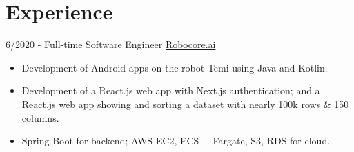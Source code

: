 \documentclass[letterpaper]{twentysecondcv} %
\begin{document}
\makeprofile %



\section{Experience}{\faAlignJustify}

\begin{twenty} %


\twentyitem
    	{6/2020 - }
	{}
         {Full-time Software Engineer}
         {\href{https://www.robocore.ai}{Robocore.ai}}
        {}
        {\vspace{-2mm}\begin{itemize}[topsep=0pt,partopsep=0pt]
				\item Development of Android apps on the robot Temi using Java and Kotlin.
				\item Development of a React.js web app with Next.js authentication; and a React.js web app showing and sorting a dataset with nearly 100k rows \& 150 columns.
				\item Spring Boot for backend; AWS EC2, ECS + Fargate, S3, RDS for cloud.
				\end{itemize} }\\


\end{twenty}
\end{document}

